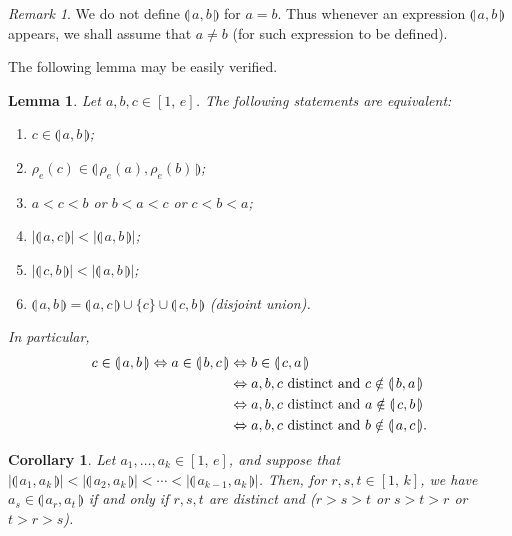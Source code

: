 \documentclass[11pt,a4paper,reqno]{amsart}
\numberwithin{equation}{section}
\theoremstyle{plain}
\newtheorem{cor}[thm]{Corollary}
\newtheorem{lem}[thm]{Lemma}
\theoremstyle{definition}
\theoremstyle{remark}
\newtheorem{rem}[thm]{Remark}
\numberwithin{equation}{section}
\newcommand{\rr}{\rho}
\newcommand{\ft}[2]{\llparenthesis\, #1,#2 \,\rrparenthesis}
\begin{document}
\begin{rem}
We do not define $\ft{a}{b}$ for $a = b$.  Thus whenever an expression $\ft{a}{b}$ appears, we shall assume that $a\ne b$ (for such expression to be defined).
\end{rem}


The following lemma may be easily verified.

\begin{lem} \label{L:ee}
Let $a,b,c \in [1,\,e]$.  The following statements are equivalent:
\begin{enumerate}
\item $c \in \ft{a}{b}$;
\item $\rr_e(c) \in \ft{\rr_e(a)}{\rr_e(b)}$;
\item $a < c < b$ or $b < a < c$ or $c < b < a$;
\item $|\ft{a}{c}| < |\ft{a}{b}|$;
\item $|\ft{c}{b}| < |\ft{a}{b}|$;
\item $\ft{a}{b} = \ft{a}{c} \cup \{c\} \cup \ft{c}{b}$ (disjoint union).
\end{enumerate}
In particular,
\begin{align}
c \in \ft{a}{b} \Leftrightarrow a \in \ft{b}{c} &\Leftrightarrow b \in \ft{c}{a} \notag \\
&\Leftrightarrow a, b, c \text{ distinct and } c \notin \ft{b}{a} \notag \\
&\Leftrightarrow a, b, c \text{ distinct and } a \notin \ft{c}{b} \notag \\
&\Leftrightarrow a, b, c \text{ distinct and } b \notin \ft{a}{c}. \label{E:ee}
\end{align}
\end{lem}


\begin{cor} \label{C:impt}
Let $a_1,\dotsc, a_k \in [1,\,e]$, and suppose that $|\ft{a_1}{a_k}| < |\ft{a_2}{a_k}| < \dotsb < |\ft{a_{k-1}}{a_k}|$.
Then, for $r,s,t \in [1,\, k]$, we have
$a_s \in \ft{a_r}{a_t}$ if and only if $r,s,t$ are distinct and ($r > s > t$ or $s > t > r$ or $t > r > s$).
\end{cor}
\end{document}
